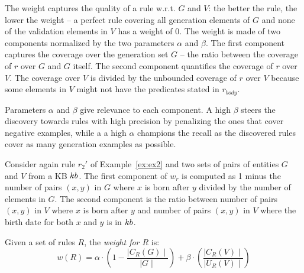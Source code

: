 The weight 
captures the quality of a rule w.r.t. $G$ and $V$: the better the rule, the lower the weight -- a perfect rule covering all generation elements of $G$ and none of the validation elements in $V$ has a weight of $0$.
%
The weight is made of two components normalized by the two parameters $\alpha$ and $\beta$.
The first component captures the coverage over the generation set $G$ -- the ratio between the coverage of $r$ over $G$ and $G$ itself.
The second component quantifies the coverage of $r$ over $V$. The coverage over $V$ is divided by the unbounded coverage of $r$ over $V$
because some elements in $V$ might not have the predicates stated in $r_{body}$.

Parameters $\alpha$ and $\beta$ give relevance to each component. A high $\beta$ steers the discovery towards rules with high precision by penalizing the ones that cover negative examples, %
while a a high $\alpha$ champions the recall as the discovered rules cover as many generation examples as possible.

\begin{example}
	Consider again rule $r_2'$ of Example~\ref{ex:ex2} and two sets of pairs of entities $G$ and $V$ from a KB ${\sc kb}$. 
The first component of $w_r$ is computed as 1 minus the number of pairs $(x,y)$ in $G$ where
		$x$ is born after $y$ divided by the number of elements in $G$.
The second component is the ratio between number of pairs $(x,y)$ in $V$ where $x$ is born after $y$ and number of pairs $(x,y)$ in $V$ where the birth date for both $x$ and $y$ is in ${\sc kb}$.
\end{example}

\begin{definition}
	Given a set of rules $R$, the {\em weight for $R$} is:
	\begin{equation*}
		w(R) = \alpha \cdot (1-\frac{\mid C_{R}(G)\mid}{\mid G \mid}) +\beta \cdot (\frac{\mid C_{R}(V) \mid}{\mid U_{R}(V)\mid})
	\end{equation*}
\end{definition}

